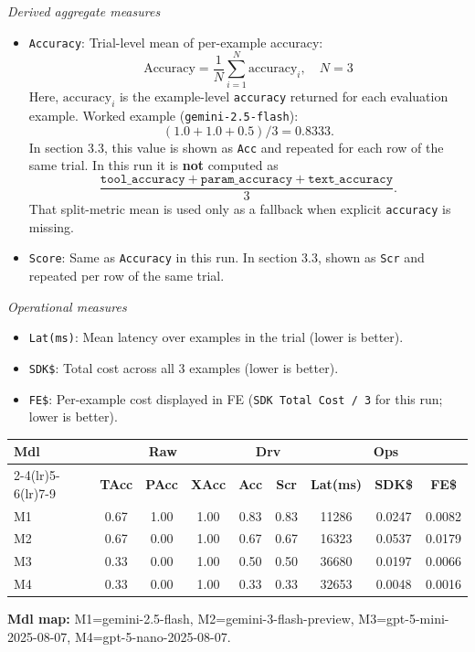 \documentclass[11pt]{article}
\newcommand{\good}[1]{\cellcolor{ScaleGood}#1}
\newcommand{\midv}[1]{\cellcolor{ScaleMid}#1}
\newcommand{\bad}[1]{\cellcolor{ScaleBad}#1}
\begin{document}
\textit{Derived aggregate measures}
\begin{itemize}
    \item \texttt{Accuracy}: Trial-level mean of per-example accuracy:
    \[
    \mathrm{Accuracy}=\frac{1}{N}\sum_{i=1}^{N}\mathrm{accuracy}_i,\quad N=3
    \]
    Here, \(\mathrm{accuracy}_i\) is the example-level \texttt{accuracy} returned for each evaluation example.
    Worked example (\texttt{gemini-2.5-flash}):
    \[
    (1.0 + 1.0 + 0.5) / 3 = 0.8333.
    \]
    In section 3.3, this value is shown as \texttt{Acc} and repeated for each row of the same trial.
    In this run it is \textbf{not} computed as
    \[
    \frac{\texttt{tool\_accuracy}+\texttt{param\_accuracy}+\texttt{text\_accuracy}}{3}.
    \]
    That split-metric mean is used only as a fallback when explicit \texttt{accuracy} is missing.
    \item \texttt{Score}: Same as \texttt{Accuracy} in this run. In section 3.3, shown as \texttt{Scr} and repeated per row of the same trial.
\end{itemize}

\textit{Operational measures}
\begin{itemize}
    \item \texttt{Lat(ms)}: Mean latency over examples in the trial (lower is better).
    \item \texttt{SDK\$}: Total cost across all 3 examples (lower is better).
    \item \texttt{FE\$}: Per-example cost displayed in FE (\texttt{SDK Total Cost / 3} for this run; lower is better).
\end{itemize}

\begin{table}[H]
\centering
\scriptsize
\setlength{\tabcolsep}{4pt}
\begin{tabular}{lcccccccc}
\toprule
\textbf{Mdl} & \multicolumn{3}{c}{\textbf{Raw}} & \multicolumn{2}{c}{\textbf{Drv}} & \multicolumn{3}{c}{\textbf{Ops}} \\
\cmidrule(lr){2-4}\cmidrule(lr){5-6}\cmidrule(lr){7-9}
 & \textbf{TAcc} & \textbf{PAcc} & \textbf{XAcc} & \textbf{Acc} & \textbf{Scr} & \textbf{Lat(ms)} & \textbf{SDK\$} & \textbf{FE\$} \\
\midrule
M1 & \midv{0.67} & \good{1.00} & \good{1.00} & \good{0.83} & \good{0.83} & \good{11286} & \midv{0.0247} & \midv{0.0082} \\
M2 & \midv{0.67} & \bad{0.00} & \good{1.00} & \midv{0.67} & \midv{0.67} & \midv{16323} & \bad{0.0537} & \bad{0.0179} \\
M3 & \bad{0.33} & \bad{0.00} & \good{1.00} & \midv{0.50} & \midv{0.50} & \bad{36680} & \midv{0.0197} & \midv{0.0066} \\
M4 & \bad{0.33} & \bad{0.00} & \good{1.00} & \bad{0.33} & \bad{0.33} & \bad{32653} & \good{0.0048} & \good{0.0016} \\
\bottomrule
\end{tabular}
\end{table}
\vspace{-0.6em}
{\footnotesize\textbf{Mdl map:} M1=gemini-2.5-flash, M2=gemini-3-flash-preview, M3=gpt-5-mini-2025-08-07, M4=gpt-5-nano-2025-08-07.}
\end{document}
